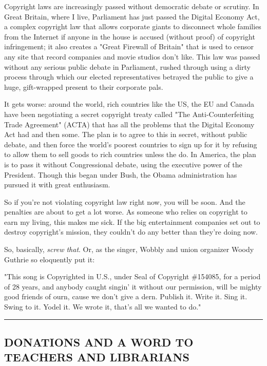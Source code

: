Copyright laws are increasingly passed without democratic debate or
scrutiny. In Great Britain, where I live, Parliament has just
passed the Digital Economy Act, a complex copyright law that allows
corporate giants to disconnect whole families from the Internet if
anyone in the house is accused (without proof) of copyright
infringement; it also creates a "Great Firewall of Britain" that is
used to censor any site that record companies and movie studios
don't like. This law was passed without any serious public debate
in Parliament, rushed through using a dirty process through which
our elected representatives betrayed the public to give a huge,
gift-wrapped present to their corporate pals.

It gets worse: around the world, rich countries like the US, the EU
and Canada have been negotiating a secret copyright treaty called
"The Anti-Counterfeiting Trade Agreement" (ACTA) that has all the
problems that the Digital Economy Act had and then some. The plan
is to agree to this in secret, without public debate, and then
force the world's poorest countries to sign up for it by refusing
to allow them to sell goods to rich countries unless the do. In
America, the plan is to pass it without Congressional debate, using
the executive power of the President. Though this began under Bush,
the Obama administration has pursued it with great enthusiasm.

So if you're not violating copyright law right now, you will be
soon. And the penalties are about to get a lot worse. As someone
who relies on copyright to earn my living, this makes me sick. If
the big entertainment companies set out to destroy copyright's
mission, they couldn't do any better than they're doing now.

So, basically, \emph{screw that}. Or, as the singer, Wobbly and
union organizer Woody Guthrie so eloquently put it:

"This song is Copyrighted in U.S., under Seal of Copyright
\#154085, for a period of 28 years, and anybody caught singin' it
without our permission, will be mighty good friends of ourn, cause
we don't give a dern. Publish it. Write it. Sing it. Swing to it.
Yodel it. We wrote it, that's all we wanted to do."

\begin{center}\rule{3in}{0.4pt}\end{center}

\subsection{DONATIONS AND A WORD TO TEACHERS AND LIBRARIANS}

